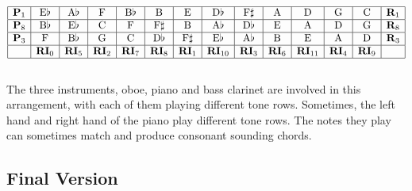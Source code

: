 \documentclass{article}
\begin{document}
\[\begin{array}{|c|c|c|c|c|c|c|c|c|c|c|c|c|c|}
\hline
\mathbf{P}_1&\mathrm{E}\flat&\mathrm{A}\flat&\mathrm{F}&\mathrm{B}\flat&\mathrm{B}&\mathrm{E}&\mathrm{D}\flat&\mathrm{F}\sharp&\mathrm{A}&\mathrm{D}&\mathrm{G}&\mathrm{C}&\mathbf{R}_1\\
\hline
\mathbf{P}_8&\mathrm{B}\flat&\mathrm{E}\flat&\mathrm{C}&\mathrm{F}&\mathrm{F}\sharp&\mathrm{B}&\mathrm{A}\flat&\mathrm{D}\flat&\mathrm{E}&\mathrm{A}&\mathrm{D}&\mathrm{G}&\mathbf{R}_8\\
\hline
\mathbf{P}_3&\mathrm{F}&\mathrm{B}\flat&\mathrm{G}&\mathrm{C}&\mathrm{D}\flat&\mathrm{F}\sharp&\mathrm{E}\flat&\mathrm{A}\flat&\mathrm{B}&\mathrm{E}&\mathrm{A}&\mathrm{D}&\mathbf{R}_3\\
\hline
&\mathbf{RI}_0&\mathbf{RI}_5&\mathbf{RI}_2&\mathbf{RI}_7&\mathbf{RI}_8&\mathbf{RI}_1&\mathbf{RI}_{10}&\mathbf{RI}_3&\mathbf{RI}_6&\mathbf{RI}_{11}&\mathbf{RI}_4&\mathbf{RI}_9&\\
\hline
\end{array}\]
\\
The three instruments, oboe, piano and bass clarinet are involved in this arrangement, with each of them playing different tone rows. Sometimes, the left hand and right hand of the piano play different tone rows. The notes they play can sometimes match and produce consonant sounding chords.

\subsection{Final Version}


\end{document}
